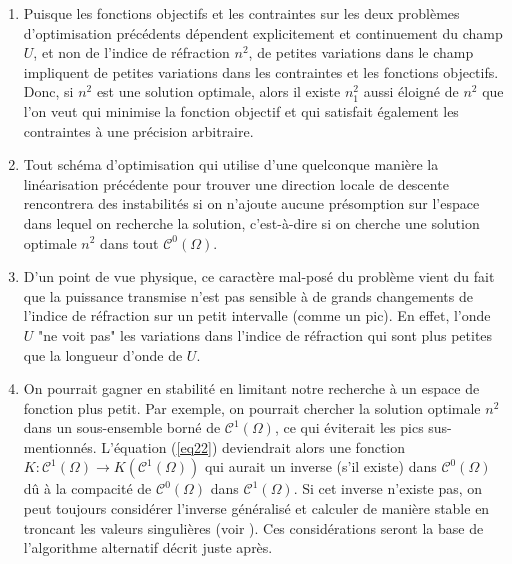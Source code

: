 \documentclass{article}
\begin{document}
\begin{enumerate}
\item Puisque les fonctions objectifs et les contraintes sur les deux problèmes d'optimisation précédents dépendent explicitement et continuement du champ $U$, et non de l'indice de réfraction $n^2$, de petites variations dans le champ impliquent de petites variations dans les contraintes et les fonctions objectifs. Donc, si $n^2$ est une solution optimale, alors il existe $n_1^2$ aussi éloigné de $n^2$ que l'on veut qui minimise la fonction objectif et qui satisfait également les contraintes à une précision arbitraire.
\item Tout schéma d'optimisation qui utilise d'une quelconque manière la linéarisation précédente pour trouver une direction locale de descente rencontrera des instabilités si on n'ajoute aucune présomption sur l'espace dans lequel on recherche la solution, c'est-à-dire si on cherche une solution optimale $n^2$ dans tout $\mathscr{C}^0(\Omega)$.
\item D'un point de vue physique, ce caractère mal-posé du problème vient du fait que la puissance transmise n'est pas sensible à de grands changements de l'indice de réfraction sur un petit intervalle (comme un pic). En effet, l'onde $U$ "ne voit pas" les variations dans l'indice de réfraction qui sont plus petites que la longueur d'onde de $U$.
\item On pourrait gagner en stabilité en limitant notre recherche à un espace de fonction plus petit. Par exemple, on pourrait chercher la solution optimale $n^2$ dans un sous-ensemble borné de $\mathscr{C}^1(\Omega)$, ce qui éviterait les pics sus-mentionnés. L'équation (\ref{eq22}) deviendrait alors une fonction $K : \mathscr{C}^1(\Omega)\to K(\mathscr{C}^1(\Omega))$ qui aurait un inverse (s'il existe) dans $\mathscr{C}^0(\Omega)$ dû à la compacité de $\mathscr{C}^0(\Omega)$ dans $\mathscr{C}^1(\Omega)$. Si cet inverse n'existe pas, on peut toujours considérer l'inverse généralisé et calculer de manière stable en troncant les valeurs singulières (voir \cite{engl96regu}). Ces considérations seront la base de l'algorithme alternatif décrit juste après.
\end{enumerate}
\end{document}
